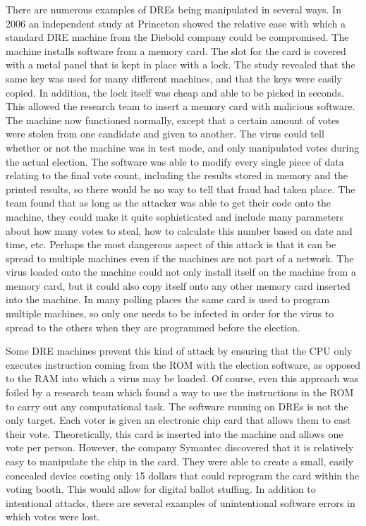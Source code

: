 \documentclass[12pt, titlepage]{article}
\begin{document}
There are numerous examples of DREs being manipulated in several ways. In 2006 an independent study at Princeton showed the relative ease with which a standard DRE machine from the Diebold company could be compromised. \cite{feldman2006security} The machine installs software from a memory card. The slot for the card is covered with a metal panel that is kept in place with a lock. The study revealed that the same key was used for many different machines, and that the keys were easily copied. In addition, the   lock itself was cheap and able to be picked in seconds. This allowed the research team to insert a memory card with malicious software. The machine now functioned normally, except that a certain amount of votes were stolen from one candidate and given to another. The virus could tell whether or not the machine was in test mode, and only manipulated votes during the actual election. The software was able to modify every single piece of data relating to the final vote count, including the results stored in memory and the printed results, so there would be no way to tell that fraud had taken place. The team found that as long as the attacker was able to get their code onto the machine, they could make it quite sophisticated and include many parameters about how many votes to steal, how to calculate this number based on date and time, etc. Perhaps the most dangerous aspect of this attack is that it can be spread to multiple machines even if the machines are not part of a network. The virus loaded onto the machine could not only install itself on the machine from a memory card, but it could also copy itself onto any other memory card inserted into the machine. In many polling places the same card is used to program multiple machines, so only one needs to be infected in order for the virus to spread to the others when they are programmed before the election.

Some DRE machines prevent this kind of attack by ensuring that the CPU only executes instruction coming from the ROM with the election software, as opposed to the RAM into which a virus may be loaded. Of course, even this approach was foiled by a research team which found a way to use the instructions in the ROM to carry out any computational task. \cite{hao2016real} The software running on DREs is not the only target. Each voter is given an electronic chip card that allows them to cast their vote. Theoretically, this card is inserted into the machine and allows one vote per person. However, the company Symantec discovered that it is relatively easy to manipulate the chip in the card. They were able to create a small, easily concealed device costing only 15 dollars that could reprogram the card within the voting booth. \cite{symantec} This would allow for digital ballot stuffing. In addition to intentional attacks, there are several examples of unintentional software errors in which votes were lost. \cite{lostvotes}
\end{document}
